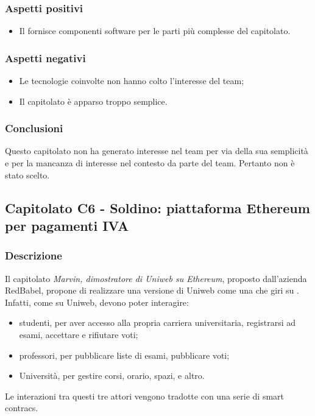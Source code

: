 		\subsubsection{Aspetti positivi}
		\begin{itemize}
			\item Il  fornisce componenti software per le parti più complesse del capitolato.
		\end{itemize}
		\subsubsection{Aspetti negativi}
		\begin{itemize}
			\item Le tecnologie coinvolte non hanno colto l'interesse del team;
			\item Il capitolato è apparso troppo semplice.
		\end{itemize}
		\subsubsection{Conclusioni}
		Questo capitolato non ha generato interesse nel team per via della sua semplicità e per la mancanza di interesse nel contesto da parte del team. Pertanto non è stato scelto.
		
		
	\subsection{Capitolato C6 - Soldino: piattaforma Ethereum per pagamenti IVA}
		\subsubsection{Descrizione}
		Il capitolato \emph{Marvin, dimostratore di Uniweb su Ethereum}, proposto dall'azienda RedBabel, propone di realizzare una versione di Uniweb come una  che giri su . \\  Infatti, come su Uniweb, devono poter interagire:
		\begin{itemize} 
			\item studenti, per aver accesso alla propria carriera universitaria, registrarsi ad esami, accettare e rifiutare voti; 
			\item professori, per pubblicare liste di esami, pubblicare voti;
			\item Università, per gestire corsi, orario, spazi, e altro.
		\end{itemize}
	 	Le interazioni tra questi tre attori vengono tradotte con una serie di smart contracs.
